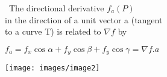 \documentclass[11 pt]{amsbook}
\begin{document}
\begin{minipage}{0.6\textwidth}\
The directional derivative $f_a(P)$\\
in the direction of a unit vector a (tangent \\
to a curve T) is related to $\nabla f$ by\par
$f_a = f_x \cos{\alpha} + f_y\cos{\beta} + f_y\cos{\gamma} = \nabla f . a $
\end{minipage}
\noindent\begin{minipage}{0.3\textwidth}
\texttt{[image: images/image2]}
\end{minipage}%
\end{document}
